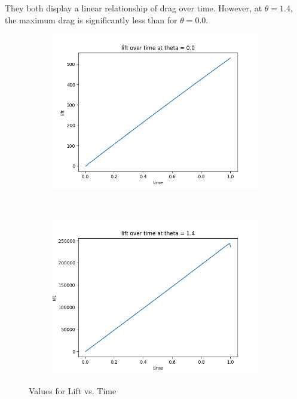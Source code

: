 \documentclass[12pt]{article}
\theoremstyle{definition}
\numberwithin{equation}{section}
\begin{document}
	They both display a linear relationship of drag over time. However, at $\theta = 1.4$, the maximum drag is significantly less than for $\theta = 0.0$.
	
	\begin{figure}[H]
		\centering
		\begin{subfigure}[t]{0.5\textwidth}
			\centering
			\includegraphics[scale=0.5]{../lift_and_drag/lift_0_0.png}
		\end{subfigure}%
		~ 
		\begin{subfigure}[t]{0.5\textwidth}
			\centering
			\includegraphics[scale=0.5]{../lift_and_drag/lift_1_4.png}
		\end{subfigure}
		\caption{Values for Lift vs. Time}
	\end{figure}
\end{document}
